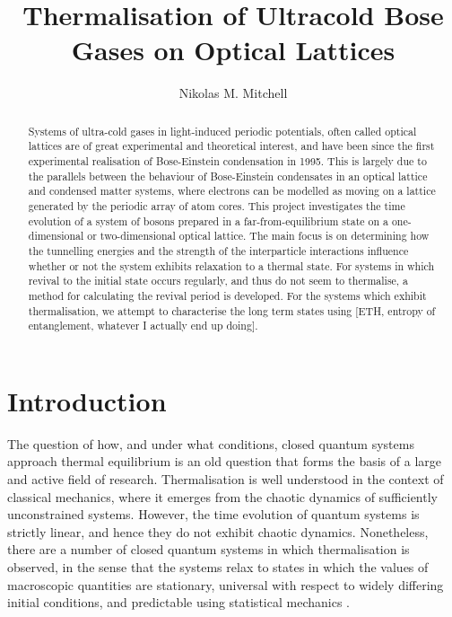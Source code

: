 \documentclass[a4paper, 10pt]{article}
\title{Thermalisation of Ultracold Bose Gases on Optical Lattices}
\author{Nikolas M. Mitchell}
\theoremstyle{plain}
\begin{document}
\maketitle

\begin{abstract}
    Systems of ultra-cold gases in light-induced periodic potentials, often
    called optical lattices are of great experimental and theoretical interest,
    and have been since the first experimental realisation of Bose-Einstein
    condensation in 1995. This is largely due to the parallels between the
    behaviour of Bose-Einstein condensates in an optical lattice and condensed
    matter systems, where electrons can be modelled as moving on a lattice
    generated by the periodic array of atom cores. This project investigates the
    time evolution of a system of bosons prepared in a far-from-equilibrium
    state on a one-dimensional or two-dimensional optical lattice. The main
    focus is on determining how the tunnelling energies and the strength of the
    interparticle interactions influence whether or not the system exhibits
    relaxation to a thermal state. For systems in which revival to the initial
    state occurs regularly, and thus do not seem to thermalise, a method for
    calculating the revival period is developed. For the systems which exhibit
    thermalisation, we attempt to characterise the long term states using [ETH,
    entropy of entanglement, whatever I actually end up doing].
\end{abstract}
\newpage

\tableofcontents
\newpage

\section*{Introduction}
The question of how, and under what conditions, closed quantum systems approach
thermal equilibrium is an old question that forms the basis of a large and
active field of research. Thermalisation is well understood in the context
of classical mechanics, where it emerges from the chaotic
dynamics of sufficiently unconstrained systems. However, the time evolution of
quantum systems is strictly linear, and hence they do not exhibit chaotic
dynamics. Nonetheless, there are a number of closed quantum systems in which
thermalisation is observed, in the sense that the systems relax to states in
which the values of macroscopic quantities are stationary, universal with
respect to widely differing initial conditions, and predictable using
statistical mechanics \cite{Rigol2008}.
\end{document}

